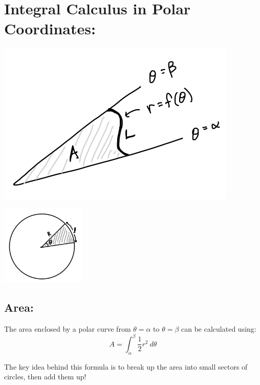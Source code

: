 \section*{Integral Calculus in Polar Coordinates:}






\begin{center}
\includegraphics[height=2.in]{polar-area-arclength.png}

\vspace*{1in}

\includegraphics[height=1.5in]{circular-sector.png}
\end{center}

\hspace*{.2in}










\subsection*{Area:}
The area enclosed by a polar curve from \(\theta = \alpha\) to \(\theta = \beta\) can be calculated using:
\[ A = \int_\alpha^\beta \frac{1}{2}r^2 \ d\theta \]

The key idea behind this formula is to break up the area into small sectors of circles, then add them up!\\~\\

